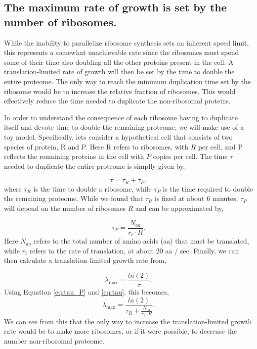 \documentclass[11pt, letterpaper]{article}
\begin{document}
\subsection{The maximum rate of growth is set by the number of
ribosomes.}

While the inability to parallelize ribosome synthesis sets an inherent speed
limit, this represents a somewhat unachievable rate since the ribosomes must
spend some of their time also doubling all the other proteins present in the
cell. A translation-limited rate of growth will then be set by the time to
double the entire proteome. The only way to reach the minimum duplication time
set by the ribosome would be to increase the relative fraction of ribosomes.
This would effectively reduce the time needed to duplicate the non-ribosomal
proteins.

In order to understand the consequence of each ribosome having to duplicate
itself and devote time to double the remaining proteome, we will make use of a
toy model. Specifically, lets consider a hypothetical cell that consists of two
species of protein, R and P. Here R refers to ribosomes, with $R$ per cell, and
P reflects the remaining proteins in the cell with $P$ copies per cell. The time
$\tau$ needed to duplicate the entire proteome is simplly given by,

\begin{equation}
	\tau = \tau_R + \tau_P,
\label{eq:tau}
\end{equation}
where $\tau_R$ is the time to double a ribosome, while $\tau_P$ is the time
required to double the remaining proteome. While we found that $\tau_R$ is fixed
at about 6 minutes,  $\tau_P$  will depend on the number of ribosomes $R$ and
can be approximated by,

\begin{equation}
\tau_P = \frac{N_{aa}}{r_t \cdot R}.
\label{eq:tau_P}
\end{equation}
Here $N_{aa}$ refers to the total number of amino acids (aa) that must be translated,
while $r_t$ refers to the rate of translation, at about 20 aa /
sec. Finally, we can then calculate a translation-limited growth rate from,

\begin{equation}
\lambda_{\text{max}} =  \frac{ln(2)} {\tau}.
\end{equation}
Using Equation \ref{eq:tau_P} and \ref{eq:tau}, this becomes,
\begin{equation}
\lambda_{\text{max}} =  \frac{ln(2)} {\tau_R + \frac{N_{aa}}{r_t \cdot R}}.
\label{eq:lambda_max}
\end{equation}
 We can see from this that the only way to increase the translation-limited
growth rate would be to make more ribosomes, or if it were possible, to decrease the
number non-ribosomal proteome.
\end{document}

